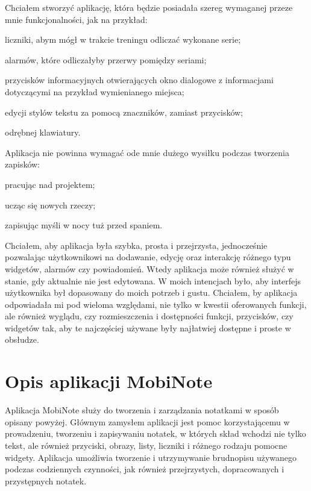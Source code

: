 \documentclass[shortabstract]{iithesis}
\begin{document}
Chciałem stworzyć aplikację, która będzie posiadała szereg wymaganej przeze mnie funkcjonalności, jak na przykład:
\begin{compactitem}
    \item liczniki, abym mógł w trakcie treningu odliczać wykonane serie;
    \item alarmów, które odliczałyby przerwy pomiędzy seriami;
    \item przycisków informacyjnych otwierających okno dialogowe z informacjami dotyczącymi na przykład wymienianego miejsca;
    \item edycji stylów tekstu za pomocą znaczników, zamiast przycisków;
    \item odrębnej klawiatury. 
\end{compactitem}
Aplikacja nie powinna wymagać ode mnie dużego wysiłku podczas tworzenia zapisków: 
\begin{compactitem}
    \item pracując nad projektem;
    \item ucząc się nowych rzeczy;
    \item zapisując myśli w nocy tuż przed spaniem.
\end{compactitem}
Chciałem, aby aplikacja była szybka, prosta i przejrzysta, jednocześnie pozwalając użytkownikowi na dodawanie, edycję oraz interakcję różnego typu widgetów, alarmów czy powiadomień. Wtedy aplikacja może również służyć w stanie, gdy aktualnie nie jest edytowana. W moich intencjach było, aby interfejs użytkownika był dopasowany do moich potrzeb i gustu. Chciałem, by aplikacja odpowiadała mi pod wieloma względami, nie tylko w kwestii oferowanych funkcji, ale również wyglądu, czy rozmieszczenia i dostępności funkcji, przycisków, czy widgetów tak, aby te najczęściej używane były najłatwiej dostępne i proste w obsłudze.

\section{Opis aplikacji MobiNote}

Aplikacja MobiNote służy do tworzenia i zarządzania notatkami w sposób opisany powyżej.
Głównym zamysłem aplikacji jest pomoc korzystającemu w prowadzeniu, tworzeniu i zapisywaniu notatek, w których skład wchodzi nie tylko tekst, ale również przyciski, obrazy, listy, liczniki i różnego rodzaju pomocne widgety.
Aplikacja umożliwia tworzenie i utrzymywanie brudnopisu używanego podczas codziennych czynności, jak również przejrzystych, dopracowanych i przystępnych  notatek.
\end{document}

